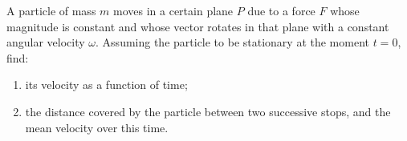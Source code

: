 \item A particle of mass \( m \) moves in a certain plane \( P \) due to a force \( F \) whose magnitude is constant and whose vector rotates in that plane with a constant angular velocity \( \omega \). Assuming the particle to be stationary at the moment \( t = 0 \), find:
    \begin{center}
    \end{center}
    \begin{enumerate}
        \item its velocity as a function of time;
        \item the distance covered by the particle between two successive stops, and the mean velocity over this time.
    \end{enumerate}